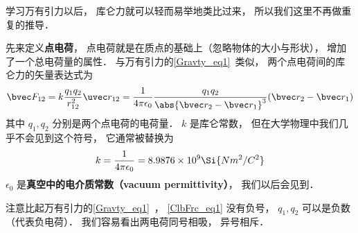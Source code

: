 

学习万有引力以后， 库仑力就可以轻而易举地类比过来， 所以我们这里不再做重复的推导．

先来定义\textbf{点电荷}， 点电荷就是在质点的基础上（忽略物体的大小与形状）， 增加了一个总电荷量的属性． 与万有引力的\autoref{Gravty_eq1}~类似， 两个点电荷间的库仑力的矢量表达式为
\begin{equation}\label{ClbFrc_eq1}
\bvec F_{12} = k\frac{q_1 q_2}{r_{12}^2} \uvec r_{12} = \frac{1}{4\pi\epsilon_0} \frac{q_1 q_2}{\abs{\bvec r_2 - \bvec r_1}^3}(\bvec r_2 - \bvec r_1)
\end{equation}
其中 $q_1, q_2$ 分别是两个点电荷的电荷量． $k$ 是库仑常数， 但在大学物理中我们几乎不会见到这个符号， 它通常被替换为
\begin{equation}
k = \frac{1}{4\pi\epsilon_0} = 8.9876\times 10^9 \Si{N m^2/C^2}
\end{equation}
$\epsilon_0$ 是\textbf{真空中的电介质常数（vacuum permittivity）}， 我们以后会见到．

注意比起万有引力的\autoref{Gravty_eq1}~， \autoref{ClbFrc_eq1} 没有负号， $q_1, q_2$ 可以是负数（代表负电荷）． 我们容易看出两电荷同号相吸， 异号相斥．
